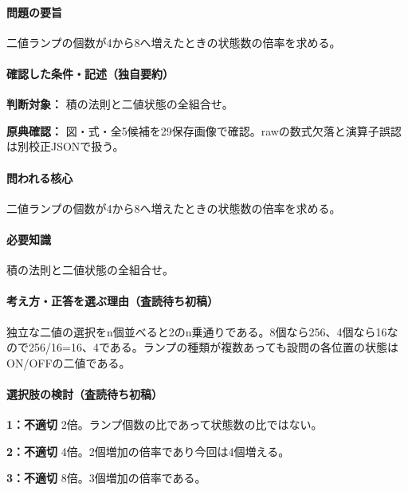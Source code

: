 \paragraph{問題の要旨} 二値ランプの個数が4から8へ増えたときの状態数の倍率を求める。

\paragraph{確認した条件・記述（独自要約）}\mbox{}\par

\noindent\textbf{判断対象：} 積の法則と二値状態の全組合せ。\par

\noindent\textbf{原典確認：} 図・式・全5候補を29保存画像で確認。rawの数式欠落と演算子誤認は別校正JSONで扱う。\par

\paragraph{問われる核心} 二値ランプの個数が4から8へ増えたときの状態数の倍率を求める。

\paragraph{必要知識} 積の法則と二値状態の全組合せ。

\paragraph{考え方・正答を選ぶ理由（査読待ち初稿）} 独立な二値の選択をn個並べると2のn乗通りである。8個なら256、4個なら16なので256/16=\allowbreak{}16、4である。ランプの種類が複数あっても設問の各位置の状態はON/OFFの二値である。

\paragraph{選択肢の検討（査読待ち初稿）}\mbox{}\par

\noindent\textbf{1：不適切} 2倍。ランプ個数の比であって状態数の比ではない。\par

\noindent\textbf{2：不適切} 4倍。2個増加の倍率であり今回は4個増える。\par

\noindent\textbf{3：不適切} 8倍。3個増加の倍率である。\par

